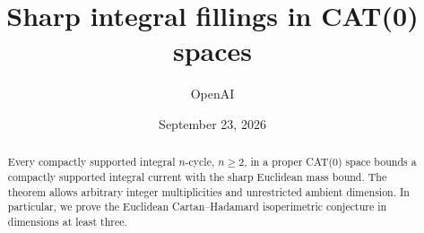 \documentclass[11pt]{article}
\title{Sharp integral fillings in CAT(0) spaces}
\author{OpenAI}
\date{September 23, 2026}
\begin{document}
\maketitle
\begin{abstract}
Every compactly supported integral $n$-cycle, $n\ge2$, in a proper
CAT(0) space bounds a compactly supported integral current with the
sharp Euclidean mass bound. The theorem allows arbitrary integer
multiplicities and unrestricted ambient dimension. In particular, we prove
the Euclidean Cartan--Hadamard isoperimetric conjecture in dimensions
at least three.
\end{abstract}








\begingroup
\small
\raggedright
\setlength{\labelsep}{1em}


\endgroup
\end{document}
